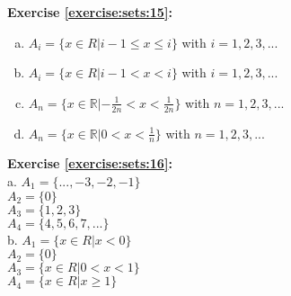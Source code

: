 \noindent\textbf{Exercise \ref{exercise:sets:15}:} %
\begin{enumerate}[(a)]
\item
$A_i=\{x\in R|i-1 \le x\le i\}$ with $i=1,2,3,...$

\item
$A_i=\{x\in R|i-1 < x < i\}$ with $i=1,2,3,...$

\item
$A_{n}=\{x\in \mathbb {R}|-\frac{1}{2n}< x < \frac{1}{2n}\}$ with $n=1,2,3,...$

 \item
$A_{n}=\{x\in \mathbb {R}|0 < x < \frac{1}{n}\}$ with $n=1,2,3,...$
\end{enumerate}

\noindent\textbf{Exercise \ref{exercise:sets:16}:}\\
a. $A_1=\{...,-3,-2,-1\} $\\
$A_2=\{0\}$\\
$A_3=\{1,2,3\}$\\
$A_4=\{4,5,6,7,...\}$\\
b. $A_1=\{x\in R|x<0\}$\\
$A_2=\{0\}$\\
$A_3=\{x\in R|0<x<1\}$\\
$A_4=\{x\in R|x\ge 1\}$\\

